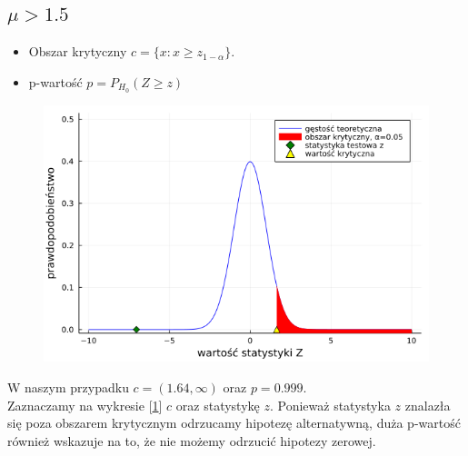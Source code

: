 \documentclass{article}
\theoremstyle{break}
\begin{document}
\subsection*{$\mu > 1.5$}	
	\begin{itemize}
		\item Obszar krytyczny $c=\{x: x\geq z_{1-\alpha}\}$.
		\item p-wartość $p=P_{H_0}(Z\geq z)$
	\end{itemize}
	\begin{figure}[H]
	\begin{center}
		\includegraphics[scale=0.5]{Z1.2.png}
		\caption{}
		\label{fig:2}
	\end{center}
	\end{figure}
	W naszym przypadku $c=(1.64,\infty)$ oraz $p=0.999$.\\
	Zaznaczamy na wykresie [\ref{fig:2}]  $c$ oraz statystykę $z$. Ponieważ statystyka $z$ znalazła się poza obszarem krytycznym odrzucamy hipotezę alternatywną, duża p-wartość również wskazuje na to, że nie możemy odrzucić hipotezy zerowej.
\end{document}

